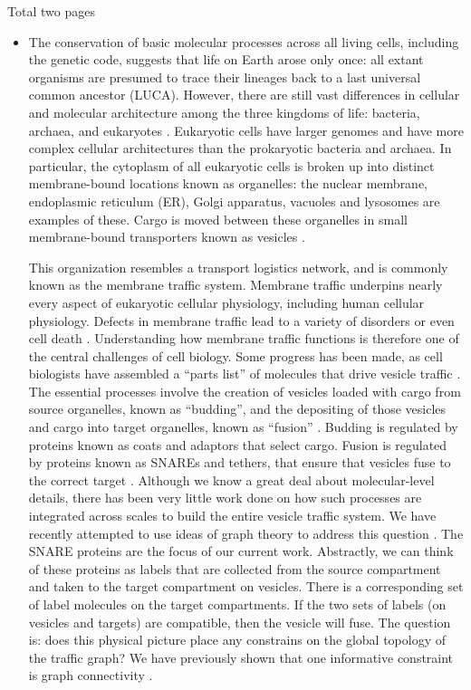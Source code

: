 Total two pages

\begin{itemize}
\item {}

The conservation of basic molecular processes across all living cells, including the genetic code, suggests that life on Earth arose only once: all extant organisms are presumed to trace their lineages back to a last universal common ancestor (LUCA). However, there are still vast differences in cellular and molecular architecture among the three kingdoms of life: bacteria, archaea, and eukaryotes \cite{embley2006eukaryotic}. Eukaryotic cells have larger genomes and have more complex cellular architectures than the prokaryotic bacteria and archaea. In particular, the cytoplasm of all eukaryotic cells is broken up into distinct membrane-bound locations known as organelles: the nuclear membrane, endoplasmic reticulum (ER), Golgi apparatus, vacuoles and lysosomes are examples of these. Cargo is moved between these organelles in small membrane-bound transporters known as vesicles \cite{stenmark2009rab}.

This organization resembles a transport logistics network, and is commonly known as the membrane traffic system. Membrane traffic underpins nearly every aspect of eukaryotic cellular physiology, including human cellular physiology. Defects in membrane traffic lead to a variety of disorders or even cell death \cite{stenmark2009rab}. Understanding how membrane traffic functions is therefore one of the central challenges of cell biology. Some progress has been made, as cell biologists have assembled a “parts list” of molecules that drive vesicle traffic \cite{dacks2007evolution}. The essential processes involve the creation of vesicles loaded with cargo from source organelles, known as “budding”, and the depositing of those vesicles and cargo into target organelles, known as “fusion” \cite{munro2004organelle}. Budding is regulated by proteins known as coats and adaptors that select cargo. Fusion is regulated by proteins known as SNAREs and tethers, that ensure that vesicles fuse to the correct target \cite{mani2016stacking}. Although we know a great deal about molecular-level details, there has been very little work done on how such processes are integrated across scales to build the entire vesicle traffic system. We have recently attempted to use ideas of graph theory to address this question \cite{mani2016stacking,shukla}. The SNARE proteins are the focus of our current work. Abstractly, we can think of these proteins as labels that are collected from the source compartment and taken to the target compartment on vesicles. There is a corresponding set of label molecules on the target compartments. If the two sets of labels (on vesicles and targets) are compatible, then the vesicle will fuse. The question is: does this physical picture place any constrains on the global topology of the traffic graph? We have previously shown that one informative constraint is graph connectivity \cite{shukla}.


\end{itemize}
